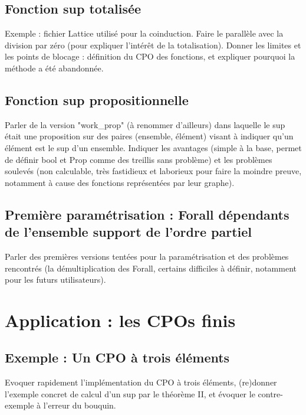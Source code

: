 \documentclass{article}
\theoremstyle{definition}
\begin{document}
\subsection{Fonction sup totalisée}

Exemple : fichier Lattice utilisé pour la coinduction. Faire le parallèle avec la division par zéro (pour expliquer l'intérêt de la totalisation). Donner les limites et les points de blocage : définition du CPO des fonctions, et expliquer pourquoi la méthode a été abandonnée.


\subsection{Fonction sup propositionnelle}

Parler de la version "work\_prop" (à renommer d'ailleurs) dans laquelle le sup était une proposition sur des paires (ensemble, élément) visant à indiquer qu'un élément est le sup d'un ensemble. Indiquer les avantages (simple à la base, permet de définir bool et Prop comme des treillis sans problème) et les problèmes soulevés (non calculable, très fastidieux et laborieux pour faire la moindre preuve, notamment à cause des fonctions représentées par leur graphe).


\subsection{Première paramétrisation : Forall dépendants de l'ensemble support de l'ordre partiel}

Parler des premières versions tentées pour la paramétrisation et des problèmes rencontrés (la démultiplication des Forall, certains difficiles à définir, notamment pour les futurs utilisateurs).



\section{Application :  les CPOs finis}


\subsection{Exemple : Un CPO à trois éléments}

Evoquer rapidement l'implémentation du CPO à trois éléments, (re)donner l'exemple concret de calcul d'un sup par le théorème II, et évoquer le contre-exemple à l'erreur du bouquin.
\end{document}
